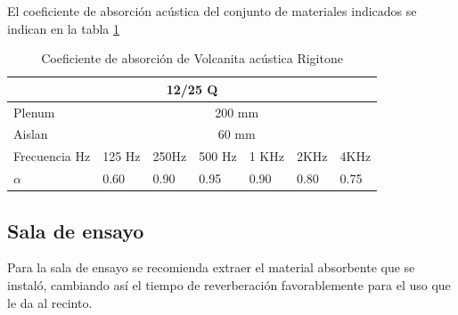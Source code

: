 El coeficiente de absorción acústica del conjunto de materiales indicados se indican en la tabla \ref{tab: coef abs volcanita Rigitone}
\begin{table}[H]
    \centering
    \begin{tabular}{|lllllll|}
    \hline
    \multicolumn{7}{|c|}{\textbf{12/25 Q}} \\ \hline
    \multicolumn{1}{|l|}{Plenum} & \multicolumn{6}{c|}{200 mm} \\ \hline
    \multicolumn{1}{|l|}{Aislan} & \multicolumn{6}{c|}{60  mm} \\ \hline
    \multicolumn{1}{|l|}{Frecuencia Hz} & \multicolumn{1}{l|}{125 Hz} & \multicolumn{1}{l|}{250Hz} & \multicolumn{1}{l|}{500 Hz} & \multicolumn{1}{l|}{1 KHz} & \multicolumn{1}{l|}{2KHz} & 4KHz \\ \hline
    \multicolumn{1}{|l|}{$\alpha$} & \multicolumn{1}{l|}{0.60} & \multicolumn{1}{l|}{0.90} & \multicolumn{1}{l|}{0.95} & \multicolumn{1}{l|}{0.90} & \multicolumn{1}{l|}{0.80} & 0.75 \\ \hline
    \end{tabular}
    \caption{Coeficiente de absorción de Volcanita acústica Rigitone}
    \label{tab: coef abs volcanita Rigitone}
\end{table}  

\subsection{Sala de ensayo}
Para la sala de ensayo se recomienda extraer el material absorbente que se instaló, cambiando así el tiempo de reverberación favorablemente para el uso que le da al recinto.
